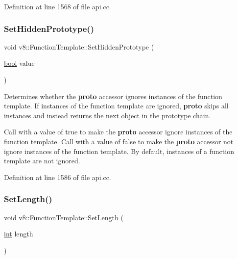 Definition at line 1568 of file api.\+cc.

\mbox{\label{classv8_1_1FunctionTemplate_ade426e8a21d777ae6100e6c1aa7bfaee}} 
\subsubsection{\texorpdfstring{Set\+Hidden\+Prototype()}{SetHiddenPrototype()}}
{\footnotesize\ttfamily void v8\+::\+Function\+Template\+::\+Set\+Hidden\+Prototype (\begin{DoxyParamCaption}\item[{\mbox{\hyperlink{classbool}{bool}}}]{value }\end{DoxyParamCaption})}

Determines whether the {\bfseries proto} accessor ignores instances of the function template. If instances of the function template are ignored, {\bfseries proto} skips all instances and instead returns the next object in the prototype chain.

Call with a value of true to make the {\bfseries proto} accessor ignore instances of the function template. Call with a value of false to make the {\bfseries proto} accessor not ignore instances of the function template. By default, instances of a function template are not ignored. 

Definition at line 1586 of file api.\+cc.

\mbox{\label{classv8_1_1FunctionTemplate_a5faf23b28ee3480b23ce054d0f389a75}} 
\subsubsection{\texorpdfstring{Set\+Length()}{SetLength()}}
{\footnotesize\ttfamily void v8\+::\+Function\+Template\+::\+Set\+Length (\begin{DoxyParamCaption}\item[{\mbox{\hyperlink{classint}{int}}}]{length }\end{DoxyParamCaption})}

